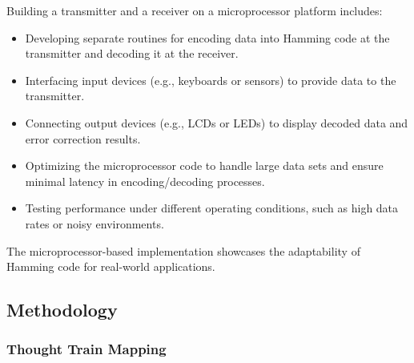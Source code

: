 \documentclass{article}
\numberwithin{equation}{section}
\numberwithin{figure}{section}
\numberwithin{table}{section}
\begin{document}
\begin{enumerate}
Building a transmitter and a receiver on a microprocessor platform includes:
\begin{itemize}
    \item Developing separate routines for encoding data into Hamming code at the transmitter and decoding it at the receiver.
    \item Interfacing input devices (e.g., keyboards or sensors) to provide data to the transmitter.
    \item Connecting output devices (e.g., LCDs or LEDs) to display decoded data and error correction results.
    \item Optimizing the microprocessor code to handle large data sets and ensure minimal latency in encoding/decoding processes.
    \item Testing performance under different operating conditions, such as high data rates or noisy environments.
\end{itemize}
The microprocessor-based implementation showcases the adaptability of Hamming code for real-world applications.



\end{enumerate}
\pagebreak
\subsection{Methodology}
 \subsubsection{Thought Train Mapping}
    
    
\end{document}
